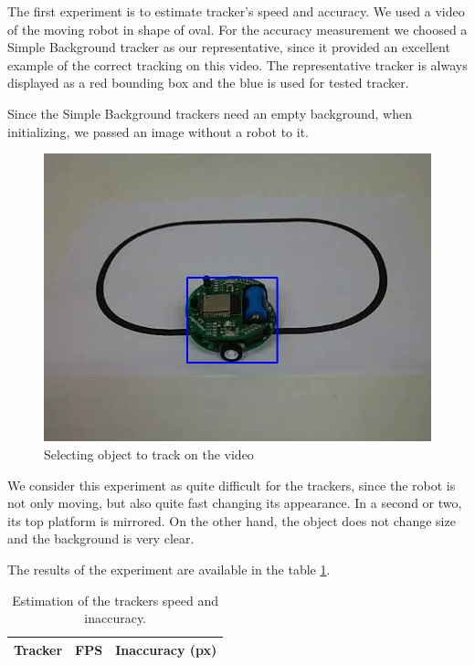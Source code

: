 The first experiment is to estimate tracker's speed and accuracy. We used a
video of the moving robot in shape of oval. For the accuracy measurement we
choosed a Simple Background tracker as our representative, since it provided an
excellent example of the correct tracking on this video. The representative
tracker is always displayed as a red bounding box and the blue is used for
tested tracker.

Since the Simple Background trackers need an empty background, when
initializing, we passed an image without a robot to it.

\begin{figure}
\centering
\includegraphics[width=0.6\linewidth]{img/robot-oval.png}
\caption{Selecting object to track on the video}
\label{fig:robot-oval}
\end{figure}

We consider this experiment as quite difficult for the trackers, since the
robot is not only moving, but also quite fast changing its appearance. In a
second or two, its top platform is mirrored. On the other hand, the object does
not change size and the background is very clear.

The results of the experiment are available in the table \ref{table:experiment-robot}.

\begin{table}
\centering
\begin{tabular}{l|l|l}
Tracker	& FPS & Inaccuracy (px) \\
\hline

\end{tabular}
\caption{Estimation of the trackers speed and inaccuracy.}
\label{table:experiment-robot}
\end{table}

